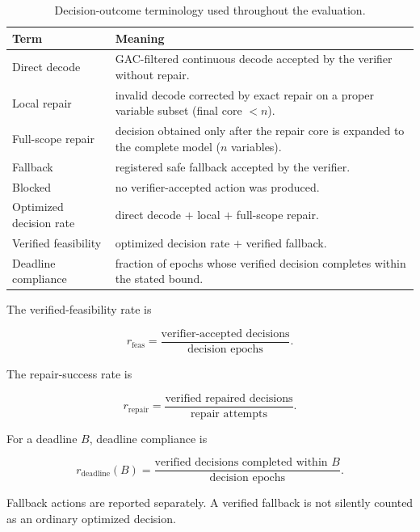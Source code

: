 \documentclass[pdflatex,sn-mathphys-num,iicol,oneside]{sn-jnl}
\begin{document}
\begin{table}[t]
\centering
\caption{Decision-outcome terminology used throughout the evaluation.}
\label{tab:terminology}
\setlength{\tabcolsep}{4pt}\small
\begin{tabular}{p{}p{}}
\toprule
Term & Meaning\\
\midrule
Direct decode & GAC-filtered continuous decode accepted by the verifier
without repair.\\
Local repair & invalid decode corrected by exact repair on a proper
variable subset (final core $<n$).\\
Full-scope repair & decision obtained only after the repair core is
expanded to the complete model ($n$ variables).\\
Fallback & registered safe fallback accepted by the verifier.\\
Blocked & no verifier-accepted action was produced.\\
Optimized decision rate & direct decode $+$ local $+$ full-scope
repair.\\
Verified feasibility & optimized decision rate $+$ verified fallback.\\
Deadline compliance & fraction of epochs whose verified decision
completes within the stated bound.\\
\bottomrule
\end{tabular}
\normalsize
\end{table}

The verified-feasibility rate is

\begin{equation}
r_{\mathrm{feas}}
=
\frac{
\text{verifier-accepted decisions}
}{
\text{decision epochs}
}.
\end{equation}

The repair-success rate is

\begin{equation}
r_{\mathrm{repair}}
=
\frac{
\text{verified repaired decisions}
}{
\text{repair attempts}
}.
\end{equation}

For a deadline $B$, deadline compliance is

\begin{equation}
r_{\mathrm{deadline}}(B)
=
\frac{
\text{verified decisions completed within }B
}{
\text{decision epochs}
}.
\end{equation}

Fallback actions are reported separately. A verified fallback is not
silently counted as an ordinary optimized decision.
\end{document}
